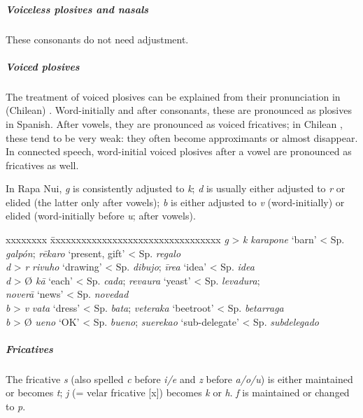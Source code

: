 \subparagraph{Voiceless plosives and nasals} These consonants do not need adjustment.

\subparagraph{Voiced plosives} The treatment of voiced plosives can be explained from their pronunciation in (Chilean) . Word-initially and after consonants, these are pronounced as plosives in Spanish. After vowels, they are pronounced as voiced fricatives; in Chilean , these tend to be very weak: they often become approximants or almost disappear. In connected speech, word-initial voiced plosives after a vowel are pronounced as fricatives as well.

In Rapa Nui,  \textit{g} is consistently adjusted to \textit{k}; \textit{d} is usually either adjusted to \textit{r} or elided (the latter only after vowels); \textit{b} is either adjusted to \textit{v} (word-initially) or elided (word-initially before \textit{u}; after vowels). 
\ea
\begin{tabbing}
 xxxxxxxx \= xxxxxxxxxxxxxxxxxxxxxxxxxxxxxxxxx\kill
 \textit{g} > \textit{k} \>  \textit{karapone} ‘barn’ {\textless} Sp. \textit{galpón}; \textit{rēkaro} ‘present, gift’ {\textless} Sp. \textit{regalo} \\
 \textit{d} > \textit{r} \>  \textit{rivuho} ‘drawing’ {\textless} Sp. \textit{dibujo}; \textit{{\ꞌ}īrea} ‘idea’ {\textless} Sp. \textit{idea} \\
 \textit{d} > Ø \>  \textit{kā} ‘each’ {\textless} Sp. \textit{cada}; \textit{revaura} ‘yeast’ {\textless} Sp. \textit{levadura}; \\
 \> \textit{noverā} ‘news’ {\textless} Sp. \textit{novedad} \\
 \textit{b} > \textit{v} \>  \textit{vata} ‘dress’ {\textless} Sp. \textit{bata}; \textit{veteraka} ‘beetroot’ {\textless} Sp. \textit{betarraga} \\
 \textit{b} > Ø \>  \textit{ueno} ‘OK’ {\textless} Sp. \textit{bueno}; \textit{suerekao} ‘sub-delegate’ {\textless} Sp. \textit{subdelegado}
\end{tabbing}
\z 
\subparagraph{Fricatives} The fricative \textit{s} (also spelled \textit{c} before \textit{i/e} and \textit{z} before \textit{a/o/u}) is either maintained or becomes \textit{t}; \textit{j} (= velar fricative [x]) becomes \textit{k} or \textit{h}. \textit{f} is maintained or changed to \textit{p}.

